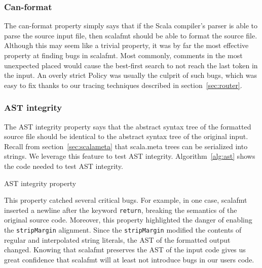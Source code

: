 \subsubsection{Can-format}
The can-format property simply says that if the Scala compiler's parser is able to parse the source input file, then scalafmt should be able to format the source file.
Although this may seem like a trivial property, it was by far the most effective property at finding bugs in scalafmt.
Most commonly, comments in the most unexpected placed would cause the best-first search to not reach the last token in the input.
An overly strict Policy was usually the culprit of such bugs, which was easy to fix thanks to our tracing techniques described in section~\ref{sec:router}.

\subsubsection{AST integrity}
The AST integrity property says that the abstract syntax tree of the formatted source file should be identical to the abstract syntax tree of the original input.
Recall from section~\ref{sec:scalameta} that scala.meta trees can be serialized into strings.
We leverage this feature to test AST integrity.
Algorithm~\ref{alg:ast} shows the code needed to test AST integrity.
\begin{algorithm}
  \caption{AST integrity property}\label{alg:ast}
  
\end{algorithm}
This property catched several critical bugs.
For example, in one case, scalafmt inserted a newline after the keyword \texttt{return}, breaking the semantics of the original source code.
Moreover, this property highlighted the danger of enabling the \texttt{stripMargin} alignment.
Since the \texttt{stripMargin} modified the contents of regular and interpolated string literals,
the AST of the formatted output changed.
Knowing that scalafmt preserves the AST of the input code gives us great confidence that scalafmt will at least not introduce bugs in our users code.

